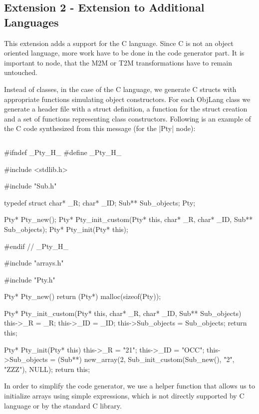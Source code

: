 \subsection{Extension 2 - Extension to Additional Languages}
\label{sec:Extension2}

This extension adds a support for the C language.
Since C is not an object oriented language, more work have to be done in the code generator part.
It is important to node, that the M2M or T2M transformations have to remain untouched.

Instead of classes, in the case of the C language, we generate C structs with appropriate functions simulating object constructors.
For each ObjLang class we generate a header file with a struct definition, a function for the struct creation and a set of functions representing class constructors.
Following is an example of the C code synthesized from this \FIXML message (for the \Scala|Pty| node):
%
\inputminted[fontsize=\fontsize{8}{8},linenos,numbersep=5pt,frame=lines,framesep=2mm]{xml}{listings/example-for-c-code.xml}
%
\begin{ccode}
#ifndef _Pty_H_
#define _Pty_H_

#include <stdlib.h>

#include "Sub.h"

typedef struct {
  char* _R;
  char* _ID;
  Sub** Sub_objects;
} Pty;

Pty* Pty_new();
Pty* Pty_init_custom(Pty* this, char* _R, char* _ID, Sub** Sub_objects);
Pty* Pty_init(Pty* this);

#endif // _Pty_H_	
\end{ccode}
%
\begin{ccode}
#include "arrays.h"

#include "Pty.h"

Pty* Pty_new() {
  return (Pty*) malloc(sizeof(Pty));
}

Pty* Pty_init_custom(Pty* this, char* _R, char* _ID, Sub** Sub_objects) {
  this->_R = _R;
  this->_ID = _ID;
  this->Sub_objects = Sub_objects;
  return this;
}

Pty* Pty_init(Pty* this) {
  this->_R = "21";
  this->_ID = "OCC";
  this->Sub_objects = (Sub**) new_array(2, Sub_init_custom(Sub_new(), "2", "ZZZ"), NULL);
  return this;
}
\end{ccode}

In order to simplify the code generator, we use a helper function  that allows us to initialize arrays using simple expressions, which is not directly supported by C language or by the standard C library.

